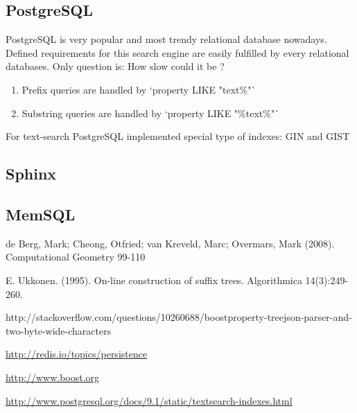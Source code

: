 \documentclass[10pt,a4paper]{article}
\begin{document}
\subsection{PostgreSQL}

PostgreSQL is very popular and most trendy relational database nowadays. Defined requirements for this search engine are easily fulfilled by every relational databases. Only question is: How slow could it be ?

\begin{enumerate}
\item Prefix queries are handled by `property LIKE "text\%"`
\item Substring queries are handled by `property LIKE "\%text\%"`
\end{enumerate}

For text-search PostgreSQL implemented special type of indexes: GIN and GIST \cite{PSQLINDEXES}

\subsection{Sphinx}


\subsection{MemSQL}



\begin{thebibliography}{99}

 de Berg, Mark; Cheong, Otfried; van Kreveld, Marc; Overmars, Mark (2008). Computational Geometry 99-110

 E. Ukkonen. (1995). On-line construction of suffix trees. Algorithmica 14(3):249-260.

 http://stackoverflow.com/questions/10260688/boostproperty-treejson-parser-and-two-byte-wide-characters

 \url{http://redis.io/topics/persistence}

 \url{http://www.boost.org}

 \url{http://www.postgresql.org/docs/9.1/static/textsearch-indexes.html}

\end{thebibliography}\
\end{document}
